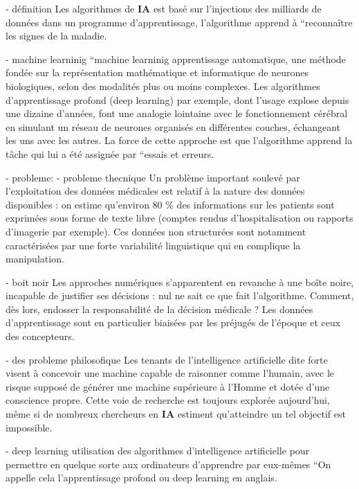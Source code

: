 - définition
    Les algorithmes de \textbf{IA} est basé sur  l'injections des milliards de
    données dans un programme d'apprentissage, l'algorithme  apprend à 
    ``reconnaître les signes de la maladie.

- machine learninig
    ``machine learninig apprentissage automatique, une méthode fondée sur
    la représentation mathématique et informatique de neurones
    biologiques, selon des modalités plus ou moins complexes. Les
    algorithmes d'apprentissage profond (deep learning) par exemple, dont
    l'usage explose depuis une dizaine d'années, font une analogie
    lointaine avec le fonctionnement cérébral en simulant un réseau de
    neurones organisés en différentes couches, échangeant les uns avec les
    autres. La force de cette approche est que l'algorithme apprend la
    tâche qui lui a été assignée par ``essais et erreurs.


- probleme:
- probleme thecnique 
    Un problème important soulevé par l'exploitation des données médicales
    est relatif à la nature des données disponibles : on estime qu'environ
    80 \% des informations sur les patients sont exprimées sous forme de
    texte libre (comptes rendus d'hospitalisation ou rapports d'imagerie
    par exemple). Ces données non structurées sont notamment caractérisées
    par une forte variabilité linguistique qui en complique la manipulation.

- boit noir 
    Les approches numériques s'apparentent en revanche à une boîte
    noire, incapable de justifier ses décisions : nul ne sait ce que
    fait l'algorithme. Comment, dès lors, endosser la responsabilité
    de la décision médicale ? Les données d'apprentissage sont en
    particulier biaisées par les préjugés de l'époque et ceux des
    concepteurs.

- des probleme philosofique 
    Les tenants de l'intelligence artificielle dite forte visent à
    concevoir une machine capable de raisonner comme l'humain, avec le
    risque supposé de générer une machine supérieure à l'Homme et dotée
    d'une conscience propre. Cette voie de recherche est toujours explorée
    aujourd'hui, même si de nombreux chercheurs en \textbf{IA} estiment
    qu'atteindre un tel objectif est impossible. 

- deep learning
    utilisation des algorithmes d'intelligence artificielle pour permettre
    en quelque sorte aux ordinateurs d'apprendre par eux-mêmes ``On
    appelle cela l'apprentissage profond ou deep learning en anglais.


